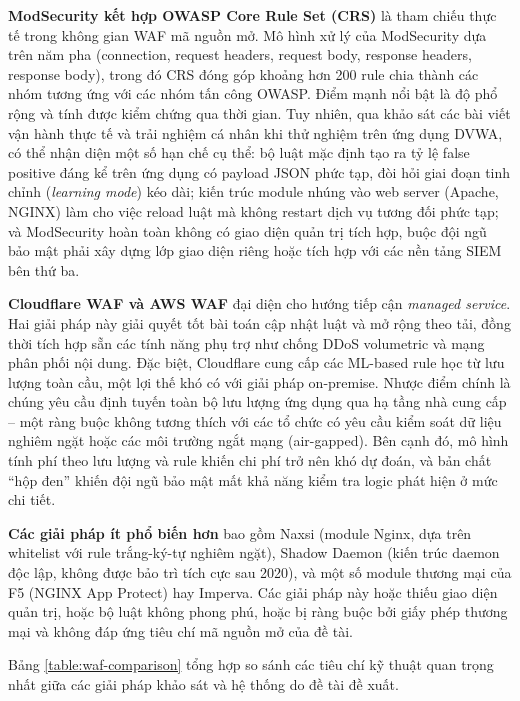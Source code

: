 \documentclass[../DoAn.tex]{subfiles}
\begin{document}
\textbf{ModSecurity kết hợp OWASP Core Rule Set (CRS)} là tham chiếu thực tế
trong không gian WAF mã nguồn mở. Mô hình xử lý của ModSecurity dựa trên năm
pha (connection, request headers, request body, response headers, response
body), trong đó CRS đóng góp khoảng hơn 200 rule chia thành các nhóm tương ứng
với các nhóm tấn công OWASP. Điểm mạnh nổi bật là độ phổ rộng và tính được kiểm
chứng qua thời gian. Tuy nhiên, qua khảo sát các bài viết vận hành thực tế và
trải nghiệm cá nhân khi thử nghiệm trên ứng dụng DVWA, có thể nhận diện một số
hạn chế cụ thể: bộ luật mặc định tạo ra tỷ lệ false positive đáng kể trên ứng
dụng có payload JSON phức tạp, đòi hỏi giai đoạn tinh chỉnh (\textit{learning
mode}) kéo dài; kiến trúc module nhúng vào web server (Apache, NGINX) làm cho
việc reload luật mà không restart dịch vụ tương đối phức tạp; và ModSecurity
hoàn toàn không có giao diện quản trị tích hợp, buộc đội ngũ bảo mật phải xây
dựng lớp giao diện riêng hoặc tích hợp với các nền tảng SIEM bên thứ ba.

\textbf{Cloudflare WAF và AWS WAF} đại diện cho hướng tiếp cận \textit{managed
service}. Hai giải pháp này giải quyết tốt bài toán cập nhật luật và mở rộng
theo tải, đồng thời tích hợp sẵn các tính năng phụ trợ như chống DDoS volumetric
và mạng phân phối nội dung. Đặc biệt, Cloudflare cung cấp các ML-based rule học
từ lưu lượng toàn cầu, một lợi thế khó có với giải pháp on-premise. Nhược điểm
chính là chúng yêu cầu định tuyến toàn bộ lưu lượng ứng dụng qua hạ tầng nhà
cung cấp -- một ràng buộc không tương thích với các tổ chức có yêu cầu kiểm
soát dữ liệu nghiêm ngặt hoặc các môi trường ngắt mạng (air-gapped). Bên cạnh
đó, mô hình tính phí theo lưu lượng và rule khiến chi phí trở nên khó dự đoán,
và bản chất ``hộp đen'' khiến đội ngũ bảo mật mất khả năng kiểm tra logic phát
hiện ở mức chi tiết.

\textbf{Các giải pháp ít phổ biến hơn} bao gồm Naxsi (module Nginx, dựa trên
whitelist với rule trắng-ký-tự nghiêm ngặt), Shadow Daemon (kiến trúc daemon
độc lập, không được bảo trì tích cực sau 2020), và một số module thương mại của
F5 (NGINX App Protect) hay Imperva. Các giải pháp này hoặc thiếu giao diện quản
trị, hoặc bộ luật không phong phú, hoặc bị ràng buộc bởi giấy phép thương mại
và không đáp ứng tiêu chí mã nguồn mở của đề tài.

Bảng \ref{table:waf-comparison} tổng hợp so sánh các tiêu chí kỹ thuật quan
trọng nhất giữa các giải pháp khảo sát và hệ thống do đề tài đề xuất.
\end{document}
